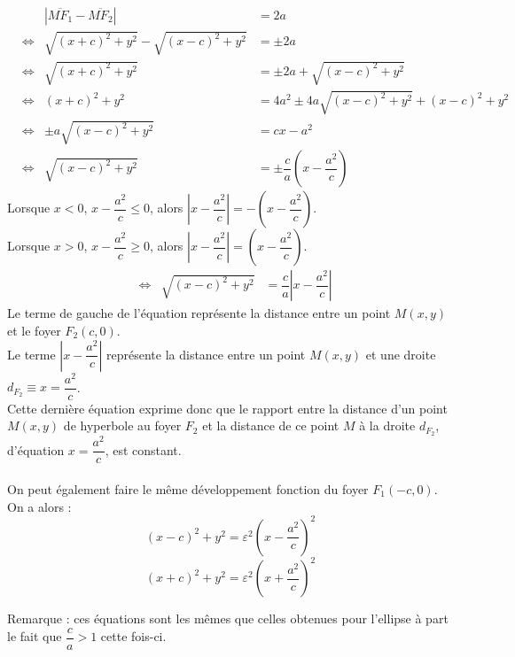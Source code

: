 \begin{eleve}
    \begin{align*}
   && |\overline{MF_1} - \overline{MF_2}| &= 2a\\
    &\iff & \sqrt{(x+c)^2 + y^2} - \sqrt{(x-c)^2 + y^2} &= \pm 2a\\
    &\iff & \sqrt{(x+c)^2 + y^2} &=\pm 2a + \sqrt{(x-c)^2 + y^2}\\
&\iff&(x+c)^2 + y^2 &= 4a^2 \pm 4a\sqrt{(x-c)^2 + y^2}+ (x-c)^2 + y^2\\
&\iff& \pm a\sqrt{(x-c)^2 + y^2} &=  cx -a^2\\
&\iff& \sqrt{(x-c)^2 + y^2} &= \pm \dfrac{c}{a}( x - \dfrac{a^2}{c})
\end{align*}
Lorsque $x<0$, $x - \dfrac{a^2}{c} \leq 0$, alors $\left\lvert x - \dfrac{a^2}{c}\right\rvert = -( x - \dfrac{a^2}{c})$.\\
Lorsque $x>0$, $x - \dfrac{a^2}{c} \geq 0$, alors $\left\lvert x - \dfrac{a^2}{c}\right\rvert = ( x - \dfrac{a^2}{c})$.\\
\begin{align*}
    &\iff& \sqrt{(x-c)^2 + y^2} &= \dfrac{c}{a}\left\lvert x - \dfrac{a^2}{c}\right\rvert
\end{align*}
Le terme de gauche de l'équation représente la distance entre un point $M(x,y)$ et le foyer $F_2(c,0)$.\\
Le terme $\left\lvert x - \dfrac{a^2}{c}\right\rvert$ représente la distance entre un point $M(x,y)$ et une droite $d_{F_2} \equiv x = \dfrac{a^2}{c}$.\\
Cette dernière équation exprime donc que le rapport entre la distance d’un point $M(x,y)$ de hyperbole au foyer $F_2$ 
et la distance de ce point $M$ à la droite $d_{F_2}$, d’équation $x = \dfrac{a^2}{c}$, est constant.\\
\\
On peut également faire le même développement fonction du foyer $F_1(-c,0)$.\\
On a alors :
\begin{equation}
    (x-c)^2 + y^2 = \varepsilon^2 \left(x - \dfrac{a^2}{c}\right)^2
\end{equation}
\begin{equation}
    (x+c)^2 + y^2 = \varepsilon^2 \left(x + \dfrac{a^2}{c}\right)^2
\end{equation}

Remarque : ces équations sont les mêmes que celles obtenues pour l'ellipse à part le fait que $\dfrac{c}{a}>1$ cette fois-ci.
\end{eleve}
\newpage
\null
\newpage

